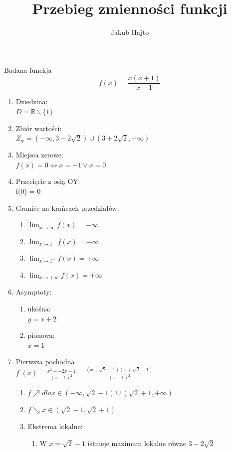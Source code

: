 \documentclass[11pt]{scrartcl}
\title{Przebieg zmienności funkcji}
\author{Jakub Hajto}
\begin{document}
	\maketitle
	\begin{center}
	Badana funckja $$ f(x) = \frac{x(x+1)}{x-1} $$
	\end{center}
	\begin{enumerate}  
		\item Dziedzina: \\
			$ D = \mathbb{R} \backslash \{1\} $
		\item Zbiór wartości: \\
			$ Z_w = (-\infty, 3 - 2\sqrt{2}) \cup (3 + 2\sqrt{2}, + \infty) $
		\item Miejsca zerowe: \\
			$ f(x) = 0 \Longleftrightarrow x = -1 \vee x = 0 $
		\item Przecięcie z osią OY: \\
			f(0) = 0
		\item Granice na krańcach przedziałów:
			\begin{enumerate}
				\item $ \lim_{x\to\infty} f(x) = -\infty $
				\item $ \lim_{x\to1^-} f(x) = -\infty $
				\item $ \lim_{x\to1^-} f(x) = +\infty $
				\item $ \lim_{x\to+\infty} f(x) = +\infty $
			\end{enumerate}
		\item Asymptoty:
			\begin{enumerate}
				\item ukośna: \\
					$ y = x + 2$
				\item pionowa: \\
					$ x=1 $
			\end{enumerate}
		\item Pierwsza pochodna \\
			$ f^{\prime}(x) = \frac{x^2 - -2x -1}{(x-1)^2} =  \frac{(x- \sqrt{2} - 1)(x + \sqrt{2} - 1)}{(x-1)^2} $
			\begin{enumerate}
				\item $ f\nearrow dla x \in (-\infty, \sqrt{2} -1) \cup (\sqrt{2} +1, +\infty) $
				\item $ f\searrow x \in ( \sqrt{2} - 1, \sqrt{2} +1 ) $
				\item Ekstrema lokalne:
					\begin{enumerate}
						\item W $ x = \sqrt{2} -1 $ istnieje maximum lokalne równe $ 3 - 2\sqrt{2} $

\end{enumerate}
\end{enumerate}
\end{enumerate}
\end{document}
